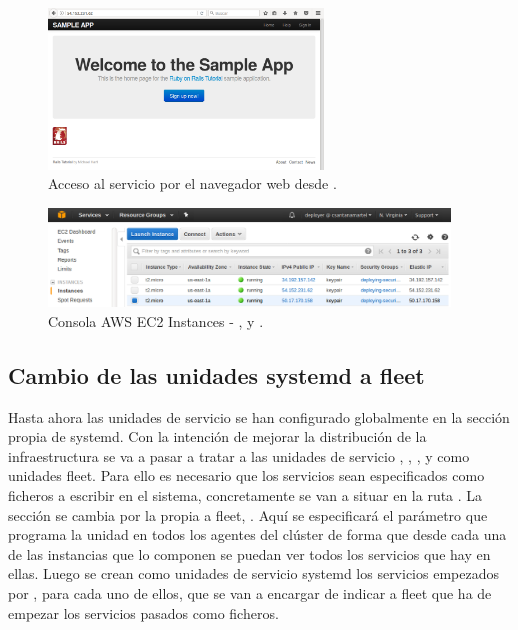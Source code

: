 \begin{figure}[H]
\centering
\includegraphics[width=0.65\textwidth]{images/figures/nav-3.png}
\caption{Acceso al servicio por el navegador web desde .}
\end{figure}

\begin{figure}[H]
\centering
\includegraphics[width=0.95\textwidth]{images/figures/aws-console-3.png}
\caption{Consola AWS EC2 Instances - ,  y .}
\end{figure}

\subsection{Cambio de las unidades systemd a fleet}

Hasta ahora las unidades de servicio se han configurado globalmente en la sección propia de systemd. Con la intención de mejorar la distribución de la infraestructura se va a pasar a tratar a las unidades de servicio , , ,  y  como unidades fleet. Para ello es necesario que los servicios sean especificados como ficheros a escribir en el sistema, concretamente se van a situar en la ruta . La sección \kode{[Install]} se cambia por la propia a fleet, \kode{[X-Fleet]}. Aquí se especificará el parámetro  que programa la unidad en todos los agentes del clúster de forma que desde cada una de las instancias que lo componen se puedan ver todos los servicios que hay en ellas. Luego se crean como unidades de servicio systemd los servicios empezados por , para cada uno de ellos, que se van a encargar de indicar a fleet que ha de empezar los servicios pasados como ficheros. 

